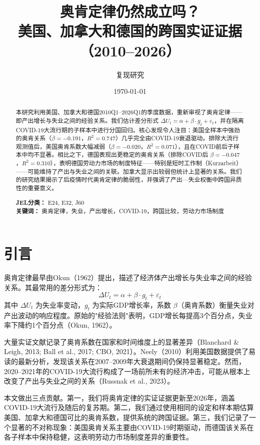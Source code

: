 \documentclass[12pt,a4paper,UTF8]{ctexart}
\title{奥肯定律仍然成立吗？ \\
       \large 美国、加拿大和德国的跨国实证证据（2010--2026）}
\author{复现研究}
\date{\today}
\begin{document}
\maketitle

\begin{abstract}
本研究利用美国、加拿大和德国2010Q1--2026Q1的季度数据，重新审视了奥肯定律——即产出增长与失业之间的经验关系。我们估计差分形式 $\Delta U_t = \alpha + \beta \cdot g_t + \varepsilon_t$，并在隔离COVID-19大流行期的子样本中进行分国回归。核心发现令人注目：美国全样本中强劲的奥肯关系（$\beta = -0.191$，$R^2 = 0.747$）几乎完全由COVID-19衰退驱动。排除大流行观测值后，美国奥肯系数大幅减弱（$\beta = -0.020$，$R^2 = 0.071$），且在COVID前后子样本中均不显著。相比之下，德国表现出更稳定的奥肯关系（排除COVID后 $\beta = -0.047$，$R^2 = 0.310$），表明德国劳动力市场的制度特征——特别是短时工作制（Kurzarbeit）——可能维持了产出与失业之间的关联。加拿大显示出较弱但统计上显著的关系。我们的研究结果揭示了后疫情时代奥肯定律的脆弱性，并强调了产出—失业权衡中跨国异质性的重要意义。

\textbf{JEL分类：} E24, E32, J60 \\
\textbf{关键词：} 奥肯定律，失业，产出增长，COVID-19，跨国比较，劳动力市场制度
\end{abstract}

\newpage

\section{引言}

奥肯定律最早由Okun（1962）提出，描述了经济体产出增长与失业率之间的经验关系。其最常用的差分形式为：
\[
\Delta U_t = \alpha + \beta \cdot g_t + \varepsilon_t
\]
其中 $\Delta U_t$ 为失业率变动，$g_t$ 为实际GDP增长率，系数 $\beta$（奥肯系数）衡量失业对产出波动的响应程度。原始的"经验法则"表明，GDP增长每提高3个百分点，失业率下降约1个百分点（Okun, 1962）。

大量实证文献记录了奥肯系数在国家和时间维度上的显著差异（Blanchard \& Leigh, 2013; Ball et al., 2017; CBO, 2021）。Neely（2010）利用美国数据提供了易读的最新分析，发现该关系在2007--2009年大衰退期间仍保持显著稳定。然而，2020--2021年的COVID-19大流行构成了一场前所未有的经济冲击，可能从根本上改变了产出与失业之间的关系（Russnak et al., 2023）。

本文做出三点贡献。第一，我们将奥肯定律的实证证据更新至2026年，涵盖COVID-19大流行及随后的复苏期。第二，我们通过使用相同的设定和样本期估算美国、加拿大和德国可比的奥肯系数，提供系统的跨国证据。第三，我们记录了一个显著的不对称现象：美国奥肯关系主要由COVID-19时期驱动，而德国该关系在各子样本中保持稳健，这表明劳动力市场制度差异的重要性。
\end{document}
